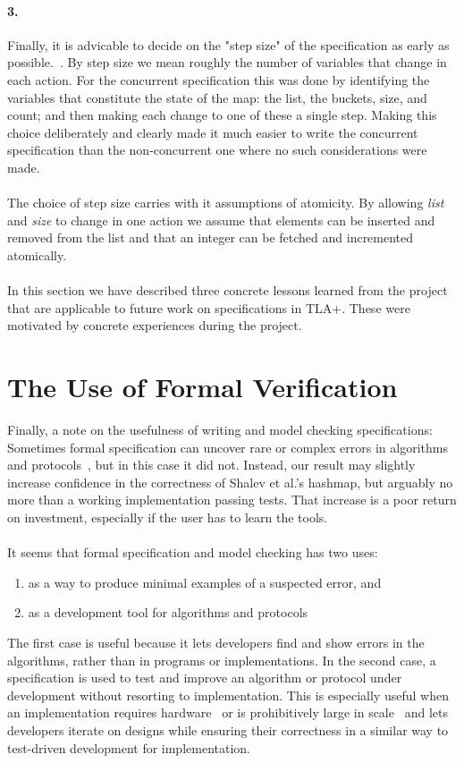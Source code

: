 \documentclass{uit-thesis}
\begin{document}
\paragraph{3.}%
Finally, it is advicable to decide on the "step size" of the specification as early as possible.~\cite{Lamport_video_2019}. By step size we mean roughly the number of variables that change in each action. For the concurrent specification this was done by identifying the variables that constitute the state of the map: the list, the buckets, size, and count; and then making each change to one of these a single step. Making this choice deliberately and clearly made it much easier to write the concurrent specification than the non-concurrent one where no such considerations were made.
\\\\
The choice of step size carries with it assumptions of atomicity. By allowing \textit{list} and \textit{size} to change in one action we assume that elements can be inserted and removed from the list and that an integer can be fetched and incremented atomically.
\\\\
In this section we have described three concrete lessons learned from the project that are applicable to future work on specifications in TLA+. These were motivated by concrete experiences during the project.

\section{The Use of Formal Verification}
Finally, a note on the usefulness of writing and model checking specifications: Sometimes formal specification can uncover rare or complex errors in algorithms and protocols~\cite{Lund2019, Zave2012}, but in this case it did not. Instead, our result may slightly increase confidence in the correctness of Shalev et al.'s hashmap, but arguably no more than a working implementation passing tests. That increase is a poor return on investment, especially if the user has to learn the tools.
\\\\
It seems that formal specification and model checking has two uses:
\begin{enumerate}
    \item as a way to produce minimal examples of a suspected error, and \label{point:error}
    \item as a development tool for algorithms and protocols \label{point:dev}
\end{enumerate}
The first case is useful because it lets developers find and show errors in the algorithms, rather than in programs or implementations. In the second case, a specification is used to test and improve an algorithm or protocol under development without resorting to implementation. This is especially useful when an implementation requires hardware~\cite{Lamport-Batson2002} or is prohibitively large in scale~\cite{Amazon2015} and lets developers iterate on designs while ensuring their correctness in a similar way to test-driven development for implementation.
\end{document}
